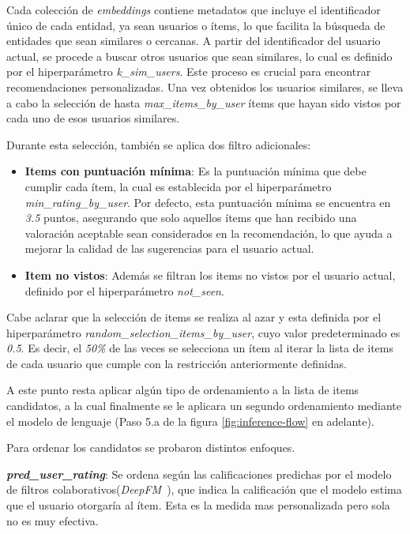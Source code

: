 \documentclass[11pt,a4paper,twoside]{thesis}
\begin{document}
Cada colección de \textit{embeddings} contiene metadatos que incluye el identificador único de cada entidad, ya sean usuarios o ítems, lo que facilita la búsqueda de entidades que sean similares o cercanas. A partir del identificador del usuario actual, se procede a buscar otros usuarios que sean similares, lo cual es definido por el hiperparámetro \textit{k\_sim\_users}. Este proceso es crucial para encontrar recomendaciones personalizadas. Una vez obtenidos los usuarios similares, se lleva a cabo la selección de hasta \textit{max\_items\_by\_user} ítems que hayan sido vistos por cada uno de esos usuarios similares.

Durante esta selección, también se aplica dos filtro adicionales:

\begin{itemize}
	\item \textbf{Items con puntuación mínima}: Es la puntuación mínima que debe cumplir cada ítem, la cual es establecida por el hiperparámetro \textit{min\_rating\_by\_user}. Por defecto, esta puntuación mínima se encuentra en \textit{3.5} puntos, asegurando que solo aquellos ítems que han recibido una valoración aceptable sean considerados en la recomendación, lo que ayuda a mejorar la calidad de las sugerencias para el usuario actual.
	\item \textbf{Item no vistos}: Además se filtran los items no vistos por el usuario actual, definido por el hiperparámetro \textit{not\_seen}.
\end{itemize}

Cabe aclarar que la selección de items se realiza al azar y esta definida por el hiperparámetro \textit{random\_selection\_items\_by\_user}, cuyo valor predeterminado es \textit{0.5}. Es decir, el \textit{50\%} de las veces se selecciona un ítem al iterar la lista de items de cada usuario que cumple con la restricción anteriormente definidas.

A este punto resta aplicar algún tipo de ordenamiento a la lista de items candidatos, a la cual finalmente se le aplicara un segundo ordenamiento mediante el modelo de lenguaje (Paso 5.a de la figura \ref{fig:inference-flow} en adelante).

Para ordenar los candidatos se probaron distintos enfoques.

\textbf{\textit{pred\_user\_rating}}: Se ordena según las calificaciones predichas por el modelo de filtros colaborativos(\textit{DeepFM}~\cite{dfmpaper, didldfm}), que indica la calificación que el modelo estima que el usuario otorgaría al ítem. Esta es la medida mas personalizada pero sola no es muy efectiva.
\end{document}
